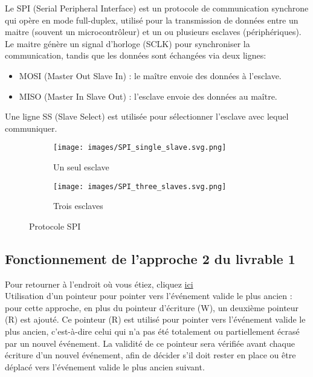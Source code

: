 \documentclass[a4paper, 12pt]{report}
\begin{document}
Le SPI (Serial Peripheral Interface) est un protocole de communication synchrone qui opère en mode full-duplex\cite{wikipedia_spi}, utilisé pour la transmission de données entre un maitre (souvent un microcontrôleur) et un ou plusieurs esclaves (périphériques). Le maitre génère un signal d'horloge (SCLK) pour synchroniser la communication, tandis que les données sont échangées via deux lignes: 
\begin{itemize}
    \item MOSI (Master Out Slave In) : le maître envoie des données à l'esclave.
    \item MISO (Master In Slave Out) : l'esclave envoie des données au maître.
\end{itemize}
Une ligne SS (Slave Select) est utilisée pour sélectionner l'esclave avec lequel communiquer.

       \begin{figure}[H]
             \centering
             \begin{subfigure}[t]{0.49\textwidth}
                 \centering
                 \texttt{[image: images/SPI\_single\_slave.svg.png]}
                 \caption{Un seul esclave}
                 \label{filtre8}
             \end{subfigure}
             \hfill
             \begin{subfigure}[t]{0.49\textwidth}
             \centering
             \texttt{[image: images/SPI\_three\_slaves.svg.png]}
             \caption{Trois esclaves}
            \label{filtre7}
             \end{subfigure}
             \centering
             \caption{Protocole SPI}
                \label{filtres}
            \end{figure}

\subsection{Fonctionnement de l'approche 2 du livrable 1}\label{subsec:AP2_L1}
Pour retourner à l'endroit où vous étiez, cliquez \hyperref[tab:lvrbl1]{ici}\\

        Utilisation d'un pointeur pour pointer vers l'événement valide le plus ancien : pour cette approche, en plus du pointeur d'écriture (W), un deuxième pointeur (R) est ajouté. Ce pointeur (R) est utilisé pour pointer vers l'événement valide le plus ancien, c'est-à-dire celui qui n'a pas été totalement ou partiellement écrasé par un nouvel événement. La validité de ce pointeur sera vérifiée avant chaque écriture d'un nouvel événement, afin de décider s'il doit rester en place ou être déplacé vers l'événement valide le plus ancien suivant.\\
        
\end{document}
